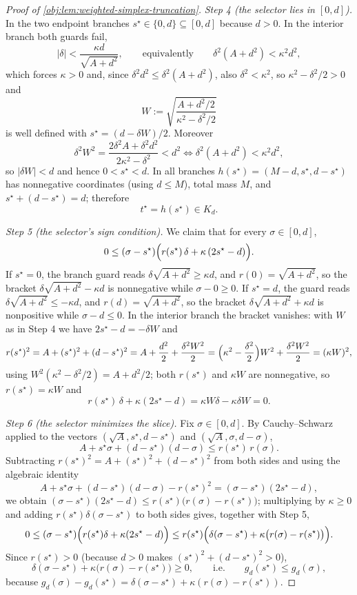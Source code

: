 \documentclass[11pt]{article}
\begin{document}
\begin{proof}[Proof of \cref{obj:lem:weighted-simplex-truncation}]
\emph{Step 4 (the selector lies in \([0,d]\)).}  In the two endpoint branches \(s^\star\in\{0,d\}\subseteq[0,d]\) because \(d>0\).  In the interior branch both guards fail,
\[
|\delta|<\frac{\kappa d}{\sqrt{A+d^2}},
\qquad\text{equivalently}\qquad
\delta^2(A+d^2)<\kappa^2d^2 ,
\]
which forces \(\kappa>0\) and, since \(\delta^2d^2\le\delta^2(A+d^2)\), also \(\delta^2<\kappa^2\), so \(\kappa^2-\delta^2/2>0\) and
\[
W:=\sqrt{\frac{A+d^2/2}{\kappa^2-\delta^2/2}}
\]
is well defined with \(s^\star=(d-\delta W)/2\).  Moreover
\[
\delta^2W^2=\frac{2\delta^2A+\delta^2d^2}{2\kappa^2-\delta^2}<d^2
\iff
\delta^2(A+d^2)<\kappa^2d^2 ,
\]
so \(|\delta W|<d\) and hence \(0<s^\star<d\).  In all branches \(h(s^\star)=(M-d,s^\star,d-s^\star)\) has nonnegative coordinates (using \(d\le M\)), total mass \(M\), and \(s^\star+(d-s^\star)=d\); therefore
\[
t^\star=h(s^\star)\in K_d .
\]

\emph{Step 5 (the selector's sign condition).}  We claim that for every \(\sigma\in[0,d]\),
\[
0\le(\sigma-s^\star)\Bigl(r(s^\star)\,\delta+\kappa\,(2s^\star-d)\Bigr).
\]
If \(s^\star=0\), the branch guard reads \(\delta\sqrt{A+d^2}\ge\kappa d\), and \(r(0)=\sqrt{A+d^2}\), so the bracket \(\delta\sqrt{A+d^2}-\kappa d\) is nonnegative while \(\sigma-0\ge0\).  If \(s^\star=d\), the guard reads \(\delta\sqrt{A+d^2}\le-\kappa d\), and \(r(d)=\sqrt{A+d^2}\), so the bracket \(\delta\sqrt{A+d^2}+\kappa d\) is nonpositive while \(\sigma-d\le0\).  In the interior branch the bracket vanishes: with \(W\) as in Step 4 we have \(2s^\star-d=-\delta W\) and
\[
r(s^\star)^2=A+(s^\star)^2+(d-s^\star)^2
=A+\frac{d^2}{2}+\frac{\delta^2W^2}{2}
=\Bigl(\kappa^2-\frac{\delta^2}{2}\Bigr)W^2+\frac{\delta^2W^2}{2}
=(\kappa W)^2 ,
\]
using \(W^2(\kappa^2-\delta^2/2)=A+d^2/2\); both \(r(s^\star)\) and \(\kappa W\) are nonnegative, so \(r(s^\star)=\kappa W\) and
\[
r(s^\star)\,\delta+\kappa(2s^\star-d)=\kappa W\delta-\kappa\delta W=0 .
\]

\emph{Step 6 (the selector minimizes the slice).}  Fix \(\sigma\in[0,d]\).  By Cauchy--Schwarz applied to the vectors \((\sqrt A,s^\star,d-s^\star)\) and \((\sqrt A,\sigma,d-\sigma)\),
\[
A+s^\star\sigma+(d-s^\star)(d-\sigma)\le r(s^\star)\,r(\sigma).
\]
Subtracting \(r(s^\star)^2=A+(s^\star)^2+(d-s^\star)^2\) from both sides and using the algebraic identity
\[
A+s^\star\sigma+(d-s^\star)(d-\sigma)-r(s^\star)^2=(\sigma-s^\star)(2s^\star-d),
\]
we obtain \((\sigma-s^\star)(2s^\star-d)\le r(s^\star)\bigl(r(\sigma)-r(s^\star)\bigr)\); multiplying by \(\kappa\ge0\) and adding \(r(s^\star)\delta(\sigma-s^\star)\) to both sides gives, together with Step 5,
\[
0\le(\sigma-s^\star)\Bigl(r(s^\star)\delta+\kappa(2s^\star-d)\Bigr)
\le r(s^\star)\Bigl(\delta(\sigma-s^\star)+\kappa\bigl(r(\sigma)-r(s^\star)\bigr)\Bigr).
\]
Since \(r(s^\star)>0\) (because \(d>0\) makes \((s^\star)^2+(d-s^\star)^2>0\)),
\[
\delta(\sigma-s^\star)+\kappa\bigl(r(\sigma)-r(s^\star)\bigr)\ge0,
\qquad\text{i.e.}\qquad
g_d(s^\star)\le g_d(\sigma),
\]
because \(g_d(\sigma)-g_d(s^\star)=\delta(\sigma-s^\star)+\kappa(r(\sigma)-r(s^\star))\). %


\end{proof}
\end{document}

